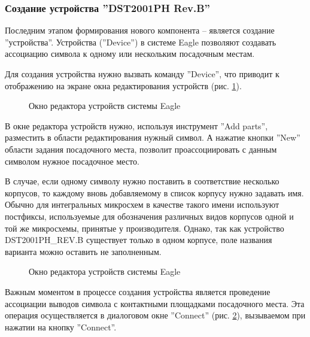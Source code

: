 \subsubsection{Создание устройства ''DST2001PH Rev.B''}
\begin{par}
Последним этапом формирования нового компонента -- является создание ''устройства''.
Устройства (''Device'') в системе Eagle позволяют создавать ассоциацию символа к
одному или нескольким посадочным местам.

Для создания устройства нужно вызвать команду ''Device'', что приводит к отображению на экране
окна редактирования устройств (рис. \ref{img:device}).
\end{par}
\begin{figure}[h]
	\caption{Окно редактора устройств системы Eagle}
	\label{img:device}
\end{figure}

В окне редактора устройств нужно, используя инструмент ''Add parts'', разместить в области
редактирования нужный символ. А нажатие кнопки ''New'' области задания посадочного места,
позволит проассоциировать с данным символом нужное посадочное место.

В случае, если одному символу нужно поставить в соответствие несколько корпусов, то каждому
вновь добавляемому в список корпусу нужно задавать имя. Обычно для интегральных
микросхем в качестве такого имени используют постфиксы, используемые для обозначения
различных видов корпусов одной и той же микросхемы, принятые у производителя. Однако,
так как устройство DST2001PH\_REV.B существует только в одном корпусе, поле названия варианта
можно оставить не заполненным.

\begin{figure}[h]
	\caption{Окно редактора устройств системы Eagle}
	\label{img:devConnect}
\end{figure}
Важным моментом в процессе создания устройства является проведение ассоциации выводов
символа с контактными площадками посадочного места. Эта операция осуществляется
в диалоговом окне ''Connect'' (рис. \ref{img:devConnect}), вызываемом при нажатии на кнопку ''Connect''.













